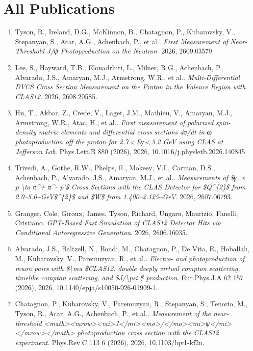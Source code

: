 \section*{All Publications}
\begin{enumerate}
\item Tyson, R., Ireland, D.G., McKinnon, B., Chatagnon, P., Kubarovsky, V., Stepanyan, S., Acar, A.G., Achenbach, P., et al.. \textit{First Measurement of Near-Threshold J/ψ Photoproduction on the Neutron}. 2026, 2609.03579.
\item Lee, S., Hayward, T.B., Elouadrhiri, L., Milner, R.G., Achenbach, P., Alvarado, J.S., Amaryan, M.J., Armstrong, W.R., et al.. \textit{Multi-Differential DVCS Cross Section Measurement on the Proton in the Valence Region with CLAS12}. 2026, 2608.20585.
\item Hu, T., Akbar, Z., Crede, V., Laget, J.M., Mathieu, V., Amaryan, M.J., Armstrong, W.R., Atac, H., et al.. \textit{First measurement of polarized spin-density matrix elements and differential cross sections dσ/dt in ω photoproduction off the proton for 2.7 < Eγ < 5.2 GeV using CLAS at Jefferson Lab}. Phys.Lett.B 880 (2026), 2026, 10.1016/j.physletb.2026.140845.
\item Trivedi, A., Gothe, R.W., Phelps, E., Mokeev, V.I., Carman, D.S., Achenbach, P., Alvarado, J.S., Amaryan, M.J., et al.. \textit{Measurements of \$γ\_v p \textbackslash{}to π\textasciicircum{}+ π\textasciicircum{}- p'\$ Cross Sections with the CLAS Detector for \$Q\textasciicircum{}\{2\}\$ from 2.0--5.0\textasciitilde{}GeV\$\textasciicircum{}\{2\}\$ and \$W\$ from 1.400--2.125\textasciitilde{}GeV}. 2026, 2607.06793.
\item Granger, Cole, Giroux, James, Tyson, Richard, Ungaro, Maurizio, Fanelli, Cristiano. \textit{GPT-Based Fast Simulation of CLAS12 Detector Hits via Conditional Autoregressive Generation}. 2026, 2606.16035.
\item Alvarado, J.S., Baltzell, N., Bondi, M., Chatagnon, P., De Vita, R., Hoballah, M., Kubarovsky, V., Paremuzyan, R., et al.. \textit{Electro- and photoproduction of muon pairs with \$\textbackslash{}mu \$CLAS12: double deeply virtual compton scattering, timelike compton scattering, and \$J/\textbackslash{}psi \$ production}. Eur.Phys.J.A 62 157 (2026), 2026, 10.1140/epja/s10050-026-01909-1.
\item Chatagnon, P., Kubarovsky, V., Paremuzyan, R., Stepanyan, S., Tenorio, M., Tyson, R., Acar, A.G., Achenbach, P., et al.. \textit{Measurement of the near-threshold <math><mrow><mi>J</mi><mo>/</mo><mi>ψ</mi></mrow></math> photoproduction cross section with the CLAS12 experiment}. Phys.Rev.C 113 6 (2026), 2026, 10.1103/lqv1-kf2n.

\end{enumerate}

